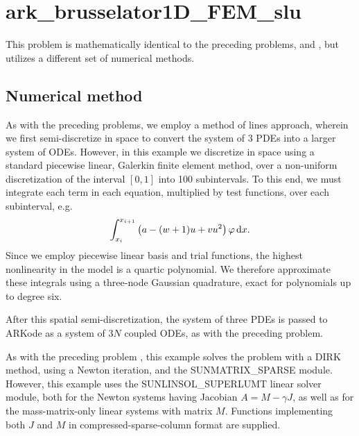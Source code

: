 \documentclass[letterpaper,10pt,english]{sphinxmanual}
\begin{document}
\section{ark\_brusselator1D\_FEM\_slu}
\label{c_serial:ark-brusselator1d-fem-slu}\label{c_serial:id22}
This problem is mathematically identical to the preceding problems,
{\hyperref[c_serial:ark-brusselator1d]{\emph{}}} and {\hyperref[c_serial:ark-brusselator1d-klu]{\emph{}}}, but
utilizes a different set of numerical methods.


\subsection{Numerical method}
\label{c_serial:id23}
As with the preceding problems, we employ a method of lines approach,
wherein we first semi-discretize in space to convert the system of 3
PDEs into a larger system of ODEs.  However, in this example we
discretize in space using a standard piecewise linear, Galerkin finite
element method, over a non-uniform discretization of the interval
\([0,1]\) into 100 subintervals.  To this end, we must integrate
each term in each equation, multiplied by test functions, over each
subinterval, e.g.
\begin{gather}
\begin{split}\int_{x_i}^{x_{i+1}} \left(a - (w+1) u + v u^2\right) \varphi\,\mathrm dx.\end{split}\notag
\end{gather}
Since we employ piecewise linear basis and trial functions, the
highest nonlinearity in the model is a quartic polynomial.  We
therefore approximate these integrals using a three-node Gaussian
quadrature, exact for polynomials up to degree six.

After this spatial semi-discretization, the system of three PDEs is
passed to ARKode as a system of \(3N\) coupled ODEs, as with the
preceding problem.

As with the preceding problem {\hyperref[c_serial:ark-brusselator1d-klu]{\emph{}}}, this
example solves the problem with a DIRK method, using a Newton
iteration, and the SUNMATRIX\_SPARSE module.  However, this example
uses the SUNLINSOL\_SUPERLUMT linear solver module, both for the Newton
systems having Jacobian \(A=M-\gamma J\), as well as for the
mass-matrix-only linear systems with matrix \(M\).  Functions
implementing both \(J\) and \(M\) in compressed-sparse-column
format are supplied.
\end{document}
